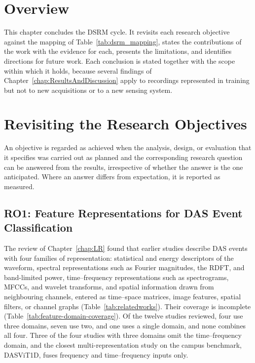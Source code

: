 \section{Overview}%
\label{sec:chap5Overview}
This chapter concludes the DSRM cycle. It revisits each research objective against the mapping of Table~\ref{tab:dsrm_mapping}, states the contributions of the work with the evidence for each, presents the limitations, and identifies directions for future work. Each conclusion is stated together with the scope within which it holds, because several findings of Chapter~\ref{chap:ResultsAndDiscussion} apply to recordings represented in training but not to new acquisitions or to a new sensing system.

\section{Revisiting the Research Objectives}
\label{sec:chap5Objectives}
An objective is regarded as achieved when the analysis, design, or evaluation that it specifies was carried out as planned and the corresponding research question can be answered from the results, irrespective of whether the answer is the one anticipated. Where an answer differs from expectation, it is reported as measured.

\subsection{RO1: Feature Representations for DAS Event Classification}
\label{sec:chap5RO1}
The review of Chapter~\ref{chap:LR} found that earlier studies describe DAS events with four families of representation: statistical and energy descriptors of the waveform, spectral representations such as Fourier magnitudes, the RDFT, and band-limited power, time--frequency representations such as spectrograms, MFCCs, and wavelet transforms, and spatial information drawn from neighbouring channels, entered as time--space matrices, image features, spatial filters, or channel graphs (Table~\ref{tab:relatedworks}). Their coverage is incomplete (Table~\ref{tab:feature-domain-coverage}). Of the twelve studies reviewed, four use three domains, seven use two, and one uses a single domain, and none combines all four. Three of the four studies with three domains omit the time--frequency domain, and the closest multi-representation study on the campus benchmark, DASViT1D, fuses frequency and time--frequency inputs only.

